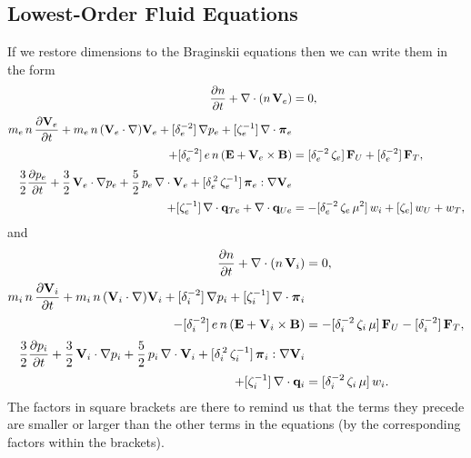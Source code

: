 \documentclass[notitlepage,12pt]{article}
\newcommand{\bpi}{\mbox{\boldmath$\pi$}}
\begin{document}
\subsection{Lowest-Order Fluid Equations}\label{lowest}
If we restore dimensions to the Braginskii equations then we can write them in the form
\begin{align}
\frac{\partial n}{\partial t} + \nabla\cdot(n\,{\bf V}_e) &= 0,\label{e3.151a}\\[0.5ex]
m_e\, n\,\frac{\partial  {\bf V}_e}{\partial t} +
m_e\, n\,({\bf V}_e\cdot\nabla){\bf V}_e+
 [\delta_e^{-2}]\,\nabla p_e+
[\zeta_e^{-1}]\, \nabla\cdot \bpi_e &\nonumber\\[0.5ex]
 +[\delta_e^{-2}]\,e\, n\,
({\bf E} + {\bf V}_e\times {\bf B})& =[\delta_e^{-2}\,\zeta_e]\, {\bf F}_U + [\delta_e^{-2}]\,
{\bf F}_T,\label{e3.151b}\\[0.5ex]
\frac{3}{2}\frac{\partial  p_e}{\partial t} + \frac{3}{2}
 \,{\bf V}_e\cdot\nabla p_e 
+ \frac{5}{2}\,p_e\,\nabla\cdot{\bf V}_e+[\delta_e^{\,2}\,\zeta_e^{-1}]\, \bpi_e:\nabla{\bf V}_e&\label{e3.151c}\\[0.5ex]
+ [\zeta_e^{-1}]\,\nabla\cdot{\bf q}_{Te} +\nabla\cdot{\bf q}_{Ue}  &=-[\delta_e^{-2}\,\zeta_e\,\mu^2]\,
 w_i+ [\zeta_e]\,w_U + w_T,\nonumber
\end{align}
and
\begin{align}\label{e3.152a}
\frac{\partial n}{\partial t} +\nabla\cdot(n\,{\bf V}_i) &= 0,\\[0.5ex]
m_i \,n\,\frac{\partial  {\bf V}_i}{\partial t} +
m_i \,n\,({\bf V}_i\cdot\nabla) {\bf V}_i +
 [\delta_i^{-2}]\,\nabla p_i + 
[\zeta_i^{-1}]\,\nabla\cdot \bpi_i &\nonumber\\[0.5ex]
- [\delta_i^{-2}]\,e \,n\,
({\bf E} + {\bf V}_i\times {\bf B})& =-[\delta_i^{-2}\,\zeta_i\,\mu]\, {\bf F}_U - [\delta_i^{-2}]\,{\bf F}_T,
\label{e3.152b}\\[0.5ex]
\frac{3}{2}\frac{\partial  p_i}{\partial t} +   \frac{3}{2}
 \,{\bf V}_i\cdot\nabla p_i
+ \frac{5}{2}\,p_i\,\nabla\cdot{\bf V}_i+[\delta_i^{\,2}\,\zeta_i^{-1}]\, \bpi_i:\nabla{\bf V}_i\nonumber\\[0.5ex]
+ [\zeta_i^{-1}]\,\nabla\cdot{\bf q}_i &= [\delta_i^{-2}\,\zeta_i\,\mu]\,w_i.\label{e3.152c}
\end{align}
The factors in square brackets are there to remind us that the terms they precede are smaller or larger than the
other terms in the equations (by the corresponding factors within the brackets). 
\end{document}
